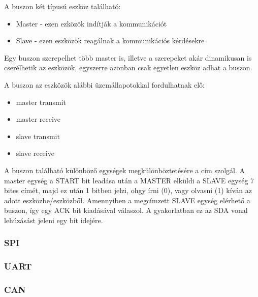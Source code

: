 



A buszon két típusú eszköz található:
\begin{itemize}
    \item Master - ezen ezközök indítják a kommunikációt
    \item Slave - ezen eszközök reagálnak a kommunikációs kérdésekre
\end{itemize}

Egy buszon szerepelhet több master is, illetve a szerepeket akár dinamikusan is cserélhetik az eszközök, egyszerre azonban csak egyetlen eszköz adhat a buszon.

A buszon az eszközök alábbi üzemállapotokkal fordulhatnak elő:
\begin{itemize}
    \item master transmit
    \item master receive
    \item slave transmit
    \item slave receive
\end{itemize}

A buszon található különböző egységek megkülönböztetésére a cím szolgál. A master egység a START bit leadása után a MASTER elküldi a SLAVE egység 7 bites címét, majd ez után 1 bitben jelzi, ohgy írni (0), vagy olvasni (1) kíván az adott eszközbe/eszközből. Amennyiben a megcímzett SLAVE egység elérhető a buszon, így egy ACK bit kiadásával válaszol. A gyakorlatban ez az SDA vonal lehúzásást jeleni egy bit idejére.











\subsubsection{SPI}





\subsubsection{UART}








\subsubsection{CAN}













\vspace{-1.5mm}
\newpage
